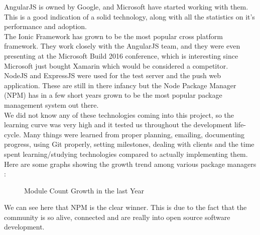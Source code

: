 AngularJS is owned by Google, and Microsoft have started working with them.
This is a good indication of a solid technology, along with all the statistics on it's performance and adoption.
\\
The Ionic Framework has grown to be the most popular cross platform framework.
They work closely with the AngularJS team, and they were even presenting at the Microsoft Build 2016 conference, which is interesting since Microsoft just bought Xamarin which would be considered a competitor.
\\
NodeJS and ExpressJS were used for the test server and the push web application. 
These are still in there infancy but the Node Package Manager (NPM) has in a few short years grown to be the most popular package management system out there.
\\
We did not know any of these technologies coming into this project, so the learning curve was very high and it tested us throughout the development life-cycle. Many things were learned from proper planning, emailing, documenting progress, using Git properly, setting milestones, dealing with clients and the time spent learning/studying technologies compared to actually implementing them.
\\

Here are some graphs showing the growth trend among various package managers \cite{module_counts}:
\begin{figure}[H] 
	\caption{Module Count Growth in the last Year }
	\label{fig:speciation}
\end{figure}
We can see here that NPM is the clear winner.
This is due to the fact that the community is so alive, connected and are really into open source software development.

